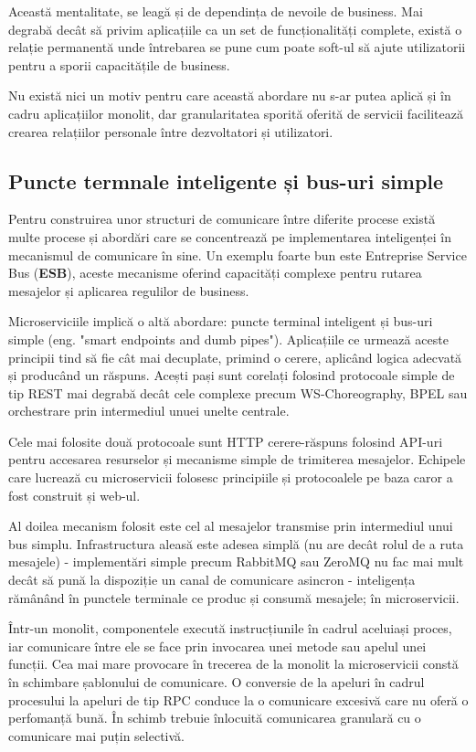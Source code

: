 \documentclass[12pt, a4paper, oneside, romanian]{teza-upb}
\begin{document}
Această mentalitate, se leagă și de dependința de nevoile de business. Mai degrabă decât să privim aplicațiile ca un set de funcționalități complete, există o relație permanentă unde întrebarea se pune cum poate soft-ul să ajute utilizatorii pentru a sporii capacitățile de business.

Nu există nici un motiv pentru care această abordare nu s-ar putea aplică și în cadru aplicațiilor monolit, dar granularitatea sporită oferită de servicii facilitează crearea relațiilor personale între dezvoltatori și utilizatori.

\subsection{Puncte termnale inteligente și bus-uri simple}

Pentru construirea unor structuri de comunicare între diferite procese există multe procese și abordări care se concentrează pe implementarea inteligenței în mecanismul de comunicare în sine. Un exemplu foarte bun este Entreprise Service Bus (\textbf{ESB}), aceste mecanisme oferind capacități complexe pentru rutarea mesajelor și aplicarea regulilor de business.

Microserviciile implică o altă abordare: puncte terminal inteligent și bus-uri simple (eng. "smart endpoints and dumb pipes"). Aplicațiile ce urmează aceste principii tind să fie cât mai decuplate, primind o cerere, aplicând logica adecvată și producând un răspuns. Acești pași sunt corelați folosind protocoale simple de tip REST mai degrabă decât cele complexe precum WS-Choreography, BPEL sau orchestrare prin intermediul unuei unelte centrale. 

Cele mai folosite două protocoale sunt HTTP cerere-răspuns folosind API-uri pentru accesarea resurselor și mecanisme simple de trimiterea mesajelor. Echipele care lucrează cu microservicii folosesc principiile și protocoalele pe baza caror a fost construit și web-ul. 

Al doilea mecanism folosit este cel al mesajelor transmise prin intermediul unui bus simplu. Infrastructura aleasă este adesea simplă (nu are decât rolul de a ruta mesajele) - implementări simple precum RabbitMQ sau ZeroMQ nu fac mai mult decât să pună la dispoziție un canal de comunicare asincron - inteligența rămânând în punctele terminale ce produc și consumă mesajele; în microservicii.

Într-un monolit, componentele execută instrucțiunile în cadrul aceluiași proces, iar comunicare între ele se face prin invocarea unei metode sau apelul unei funcții. Cea mai mare provocare în trecerea de la monolit la microservicii constă în schimbare șablonului de comunicare. O conversie de la apeluri în cadrul procesului la apeluri de tip RPC conduce la o comunicare excesivă care nu oferă o perfomanță bună. În schimb trebuie înlocuită comunicarea granulară cu o comunicare mai puțin selectivă.    
\end{document}
